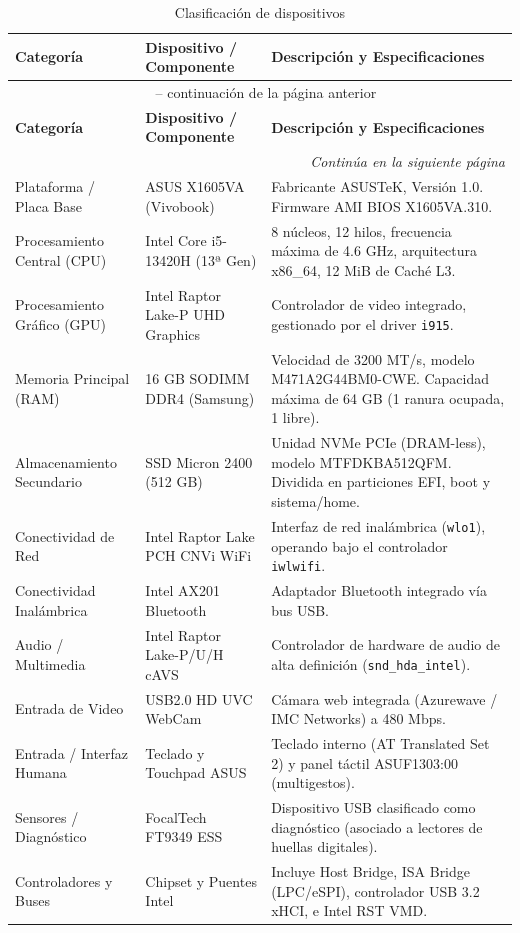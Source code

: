 \documentclass[10pt]{article}
\begin{document}
\begingroup
\footnotesize
\setlength{\LTleft}{\fill}
\setlength{\LTright}{\fill}
\setlength{\tabcolsep}{4pt}
\begin{longtable}{|p{3.5cm}|p{4.0cm}|p{6.5cm}|}
\caption{Clasificación de dispositivos} \label{tab:clasificacion} \\

\hline
\textbf{Categoría} & \textbf{Dispositivo / Componente} & \textbf{Descripción y Especificaciones} \\
\hline
\endfirsthead

\multicolumn{3}{c}{\tablename\ \thetable{} -- continuación de la página anterior} \\
\hline
\textbf{Categoría} & \textbf{Dispositivo / Componente} & \textbf{Descripción y Especificaciones} \\
\hline
\endhead

\hline \multicolumn{3}{r}{\textit{Continúa en la siguiente página}} \\
\endfoot

\hline
\endlastfoot

Plataforma / Placa Base & ASUS X1605VA (Vivobook) & Fabricante ASUSTeK, Versión 1.0. Firmware AMI BIOS X1605VA.310. \\
\hline
Procesamiento Central (CPU) & Intel Core i5-13420H (13ª Gen) & 8 núcleos, 12 hilos, frecuencia máxima de 4.6 GHz, arquitectura x86\_64, 12 MiB de Caché L3. \\
\hline
Procesamiento Gráfico (GPU) & Intel Raptor Lake-P UHD Graphics & Controlador de video integrado, gestionado por el driver \texttt{i915}. \\
\hline
Memoria Principal (RAM) & 16 GB SODIMM DDR4 (Samsung) & Velocidad de 3200 MT/s, modelo M471A2G44BM0-CWE. Capacidad máxima de 64 GB (1 ranura ocupada, 1 libre). \\
\hline
Almacenamiento Secundario & SSD Micron 2400 (512 GB) & Unidad NVMe PCIe (DRAM-less), modelo MTFDKBA512QFM. Dividida en particiones EFI, boot y sistema/home. \\
\hline
Conectividad de Red & Intel Raptor Lake PCH CNVi WiFi & Interfaz de red inalámbrica (\texttt{wlo1}), operando bajo el controlador \texttt{iwlwifi}. \\
\hline
Conectividad Inalámbrica & Intel AX201 Bluetooth & Adaptador Bluetooth integrado vía bus USB. \\
\hline
Audio / Multimedia & Intel Raptor Lake-P/U/H cAVS & Controlador de hardware de audio de alta definición (\texttt{snd\_hda\_intel}). \\
\hline
Entrada de Video & USB2.0 HD UVC WebCam & Cámara web integrada (Azurewave / IMC Networks) a 480 Mbps. \\
\hline
Entrada / Interfaz Humana & Teclado y Touchpad ASUS & Teclado interno (AT Translated Set 2) y panel táctil ASUF1303:00 (multigestos). \\
\hline
Sensores / Diagnóstico & FocalTech FT9349 ESS & Dispositivo USB clasificado como diagnóstico (asociado a lectores de huellas digitales). \\
\hline
Controladores y Buses & Chipset y Puentes Intel & Incluye Host Bridge, ISA Bridge (LPC/eSPI), controlador USB 3.2 xHCI, e Intel RST VMD. \\
\hline


\end{longtable}
\end{document}
